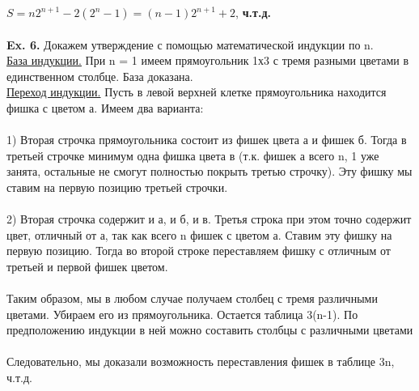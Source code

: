 \documentclass[a4paper,12pt]{article}
\begin{document}
$ S = n2^{n+1} - 2(2^n - 1) = (n-1)2^{n+1} + 2$, \textbf{ч.т.д.}
\\
\\
\textbf{Ex. 6.} Докажем утверждение с помощью математической индукции по n.
\\
\underline{База индукции.} При n = 1 имеем прямоугольник 1х3 с тремя разными цветами в единственном столбце. База доказана.
\\
\underline{Переход индукции.} Пусть в левой верхней клетке прямоугольника находится фишка с цветом а. Имеем два варианта:
\\
\\
1) Вторая строчка прямоугольника состоит из фишек цвета а и фишек б. Тогда в третьей строчке минимум одна фишка цвета в (т.к. фишек а всего n, 1 уже занята, остальные не смогут полностью покрыть третью строчку). Эту фишку мы ставим на первую позицию третьей строчки.
\\
\\
2) Вторая строчка содержит и а, и б, и в. Третья строка при этом точно содержит цвет, отличный от а, так как всего n фишек с цветом а. Ставим эту фишку на первую позицию. Тогда во второй строке переставляем фишку с отличным от третьей и первой фишек цветом.
\\
\\
Таким образом, мы в любом случае получаем столбец с тремя различными цветами. Убираем его из прямоугольника. Остается таблица 3(n-1). По предположению индукции в ней можно составить столбцы с различными цветами
\\
\\
Следовательно, мы доказали возможность переставления фишек в таблице 3n, ч.т.д.
 
\end{document}
